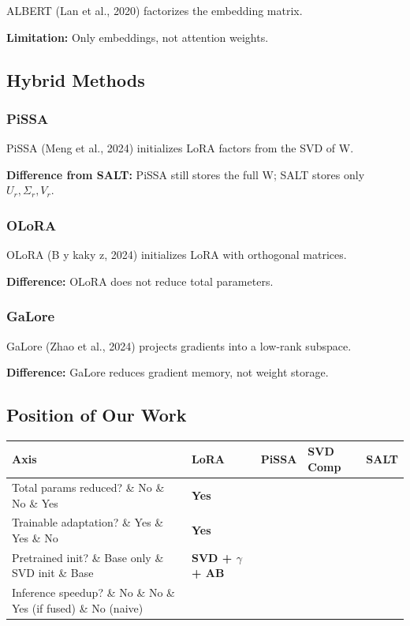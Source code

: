 ALBERT (Lan et al., 2020) factorizes the embedding matrix.

\textbf{Limitation:} Only embeddings, not attention weights.

\subsection{Hybrid Methods}

\subsubsection{PiSSA}

PiSSA (Meng et al., 2024) initializes LoRA factors from the SVD of W.

\textbf{Difference from SALT:} PiSSA still stores the full W; SALT stores only 
$U_r, \Sigma_r, V_r$.

\subsubsection{OLoRA}

OLoRA (B y kaky z, 2024) initializes LoRA with orthogonal matrices.

\textbf{Difference:} OLoRA does not reduce total parameters.

\subsubsection{GaLore}

GaLore (Zhao et al., 2024) projects gradients into a low-rank subspace.

\textbf{Difference:} GaLore reduces gradient memory, not weight storage.

\subsection{Position of Our Work}

\begin{table}[H]
\centering
\small
\begin{tabular}{lllll}
\toprule
\textbf{Axis} & \textbf{LoRA} & \textbf{PiSSA} & \textbf{SVD Comp} & \textbf{SALT} \\
\midrule
Total params reduced? \& No \& No \& Yes & \textbf{Yes} \\
Trainable adaptation? \& Yes \& Yes \& No & \textbf{Yes} \\
Pretrained init? \& Base only \& SVD init \& Base & \textbf{SVD + $\gamma$ + AB} \\
Inference speedup? \& No \& No \& Yes (if fused) \& No (naive) \\
\bottomrule
\end{tabular}
\end{table}

